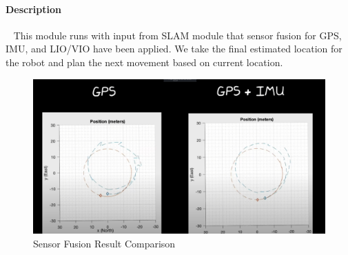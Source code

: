 \documentclass[12pt]{article}
\begin{document}
            \paragraph{Description}        
                ~\newline
                This module runs with input from SLAM module that sensor fusion for GPS, IMU, and LIO/VIO have been applied. We take the final estimated location for the robot and plan the next movement based on current location. 
                \begin{figure}[H]
                    \centering
                    \includegraphics[width=\textwidth,height=\textheight,keepaspectratio]{../sensor_fusion.png}
                    \caption{Sensor Fusion Result Comparison}
                \end{figure}
                
\end{document}
